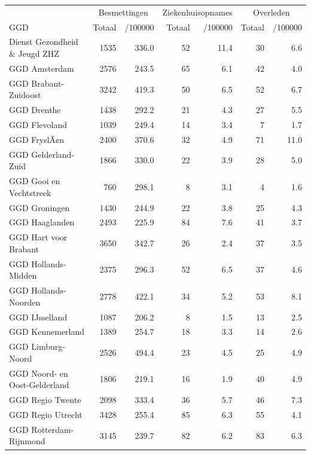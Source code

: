 \documentclass[
  english,
  man,floatsintext]{apa6}
\begin{document}
\begin{table}[H]
\centering\begingroup\fontsize{10}{12}\selectfont

\begin{threeparttable}
\begin{tabular}{lrrrrrr}
\toprule
\multicolumn{1}{c}{ } & \multicolumn{2}{c}{Besmettingen} & \multicolumn{2}{c}{Ziekenhuisopnames} & \multicolumn{2}{c}{Overleden} \\
\cmidrule(l{3pt}r{3pt}){2-3} \cmidrule(l{3pt}r{3pt}){4-5} \cmidrule(l{3pt}r{3pt}){6-7}
GGD & Totaal & /100000 & Totaal & /100000 & Totaal & /100000\\
\midrule
Dienst Gezondheid \& Jeugd ZHZ & 1535 & 336.0 & 52 & 11.4 & 30 & 6.6\\
GGD Amsterdam & 2576 & 243.5 & 65 & 6.1 & 42 & 4.0\\
GGD Brabant-Zuidoost & 3242 & 419.3 & 50 & 6.5 & 52 & 6.7\\
GGD Drenthe & 1438 & 292.2 & 21 & 4.3 & 27 & 5.5\\
GGD Flevoland & 1039 & 249.4 & 14 & 3.4 & 7 & 1.7\\
GGD FryslÃ¢n & 2400 & 370.6 & 32 & 4.9 & 71 & 11.0\\
GGD Gelderland-Zuid & 1866 & 330.0 & 22 & 3.9 & 28 & 5.0\\
GGD Gooi en Vechtstreek & 760 & 298.1 & 8 & 3.1 & 4 & 1.6\\
GGD Groningen & 1430 & 244.9 & 22 & 3.8 & 25 & 4.3\\
GGD Haaglanden & 2493 & 225.9 & 84 & 7.6 & 41 & 3.7\\
GGD Hart voor Brabant & 3650 & 342.7 & 26 & 2.4 & 37 & 3.5\\
GGD Hollands-Midden & 2375 & 296.3 & 52 & 6.5 & 37 & 4.6\\
GGD Hollands-Noorden & 2778 & 422.1 & 34 & 5.2 & 53 & 8.1\\
GGD IJsselland & 1087 & 206.2 & 8 & 1.5 & 13 & 2.5\\
GGD Kennemerland & 1389 & 254.7 & 18 & 3.3 & 14 & 2.6\\
GGD Limburg-Noord & 2526 & 494.4 & 23 & 4.5 & 25 & 4.9\\
GGD Noord- en Oost-Gelderland & 1806 & 219.1 & 16 & 1.9 & 40 & 4.9\\
GGD Regio Twente & 2098 & 333.4 & 36 & 5.7 & 46 & 7.3\\
GGD Regio Utrecht & 3428 & 255.4 & 85 & 6.3 & 55 & 4.1\\
GGD Rotterdam-Rijnmond & 3145 & 239.7 & 82 & 6.2 & 83 & 6.3\\

\end{tabular}
\end{threeparttable}
\end{table}
\end{document}
